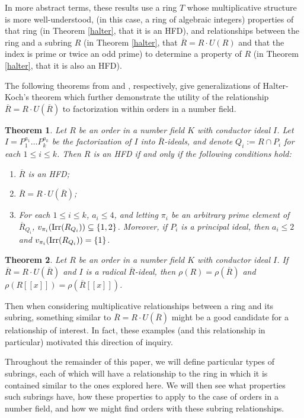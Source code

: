 \documentclass[12pt]{amsart}
\newtheorem{theorem}{Theorem}[section]
\theoremstyle{definition}
\newcommand{\Rbar}{\overline{R}}
\newcommand{\Irr}{\textup{Irr}}
\begin{document}
	In more abstract terms, these results use a ring $T$ whose multiplicative structure is more well-understood, (in this case, a ring of algebraic integers) properties of that ring (in Theorem \ref{halter}, that it is an HFD), and relationships between the ring and a subring $R$ (in Theorem \ref{halter}, that $\Rbar=R\cdot U(R)$ and that the index is prime or twice an odd prime) to determine a property of $R$ (in Theorem \ref{halter}, that it is also an HFD).
	
	The following theorems from \cite{rago} and \cite{radicalconductor}, respectively, give generalizations of Halter-Koch's theorem which further demonstrate the utility of the relationship $\Rbar=R\cdot U(\Rbar)$ to factorization within orders in a number field.
	\begin{theorem}
		\label{rago hfd}
		Let $R$ be an order in a number field $K$ with conductor ideal $I$. Let $I=P_1^{a_1}\dots P_k^{a_k}$ be the factorization of $I$ into $\Rbar$-ideals, and denote $Q_i:=R\cap P_i$ for each $1\leq i\leq k$. Then $R$ is an HFD if and only if the following conditions hold:
		\begin{enumerate}
			\item $\Rbar$ is an HFD;
			\item $\Rbar=R\cdot U(\Rbar)$;
			\item For each $1\leq i\leq k$, $a_i\leq 4$, and letting $\pi_i$ be an arbitrary prime element of $\Rbar_{Q_{i}}$, $v_{\pi_i}(\Irr(R_{Q_i}))\subseteq\{1,2\}$. Moreover, if $P_i$ is a principal ideal, then $a_i\leq 2$ and $v_{\pi_i}(\Irr(R_{Q_i}))=\{1\}$.
		\end{enumerate}
	\end{theorem}
	
	\begin{theorem}
		\label{elasticities equal}
		Let $R$ be an order in a number field $K$ with conductor ideal $I$. If $\Rbar=R\cdot U(\Rbar)$ and $I$ is a radical $\Rbar$-ideal, then $\rho(R)=\rho(\Rbar)$ and $\rho(R[[x]])=\rho(\Rbar[[x]])$.
	\end{theorem}
	
	Then when considering multiplicative relationships between a ring and its subring, something similar to $\Rbar=R\cdot U(\Rbar)$ might be a good candidate for a relationship of interest. In fact, these examples (and this relationship in particular) motivated this direction of inquiry.
	
	Throughout the remainder of this paper, we will define particular types of subrings, each of which will have a relationship to the ring in which it is contained similar to the ones explored here. We will then see what properties such subrings have, how these properties to apply to the case of orders in a number field, and how we might find orders with these subring relationships.
	
\end{document}
